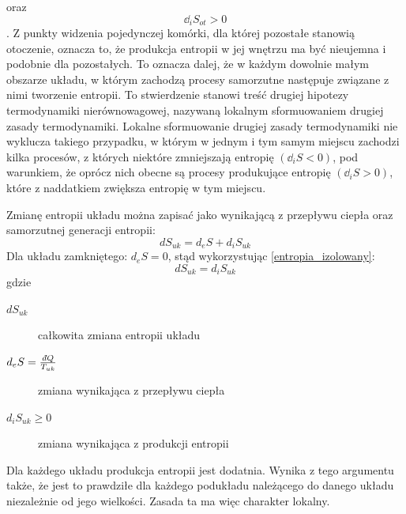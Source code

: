 \documentclass[10pt, a4paper, twoside, onecolumn]{article}
\numberwithin{equation}{section}
\newcommand{\dbar}{d\hspace*{-0.08em}\bar{}\hspace*{0.1em}}
\begin{document}
	oraz
	\begin{equation*}
		\dd_{i}S_{ot}>0
	\end{equation*}.
	Z punkty widzenia pojedynczej komórki, dla której pozostałe stanowią otoczenie, oznacza to, że produkcja entropii w jej wnętrzu ma być nieujemna i podobnie dla pozostałych. To oznacza dalej, że w każdym dowolnie małym obszarze układu, w którym zachodzą procesy samorzutne następuje związane z nimi tworzenie entropii. To stwierdzenie stanowi treść drugiej hipotezy termodynamiki nierównowagowej, nazywaną lokalnym sformuowaniem drugiej zasady termodynamiki. Lokalne sformuowanie drugiej zasady termodynamiki nie wyklucza takiego przypadku, w którym w jednym i tym samym miejscu zachodzi kilka procesów, z których niektóre zmniejszają entropię \((\dd_{i}S<0)\), pod warunkiem, że oprócz nich obecne są procesy produkujące entropię \((\dd_{i}S>0)\), które z naddatkiem zwiększa entropię w tym miejscu. 
	




	Zmianę entropii układu można zapisać jako wynikającą z przepływu ciepła oraz samorzutnej generacji entropii: 
	\begin{equation}
		dS_{uk}=d_{e}S+d_{i}S_{uk}
	\end{equation}
	Dla układu zamkniętego: \(d_{e}S=0\), stąd wykorzystując \eqref{entropia_izolowany}:
	\begin{equation}
		dS_{uk}=d_{i}S_{uk}
	\end{equation}
	gdzie
	\begin{description}
		\item[\(dS_{uk}\)] całkowita zmiana entropii układu
		\item[\(d_{e}S=\frac{\dbar Q}{T_{uk}}\)] zmiana wynikająca z przepływu ciepła
		\item[\(d_{i}S_{uk}\geq 0\)] zmiana wynikająca z produkcji entropii
	\end{description}
	Dla każdego układu produkcja entropii jest dodatnia. Wynika z tego argumentu także, że jest to prawdziłe dla każdego podukładu należącego do danego układu niezależnie od jego wielkości. Zasada ta ma więc charakter lokalny. 
	
	
	
\end{document}
